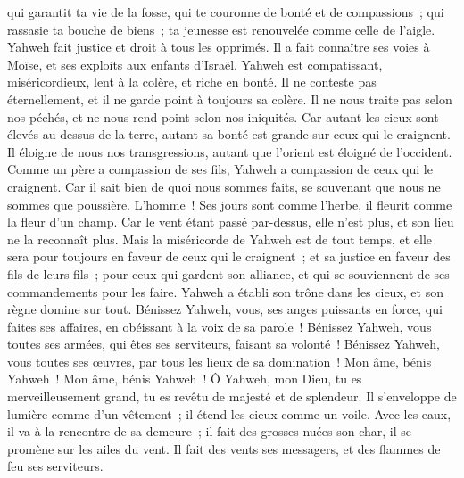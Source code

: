 \begin{multicols}{2}
qui garantit ta vie de la fosse, qui te couronne de bonté et de compassions~;
qui rassasie ta bouche de biens~; ta jeunesse est renouvelée comme celle de l'aigle.
Yahweh fait justice et droit à tous les opprimés.
Il a fait connaître ses voies à Moïse, et ses exploits aux enfants d'Israël.
Yahweh est compatissant, miséricordieux, lent à la colère, et riche en bonté.
Il ne conteste pas éternellement, et il ne garde point à toujours sa colère.
Il ne nous traite pas selon nos péchés, et ne nous rend point selon nos iniquités.
Car autant les cieux sont élevés au-dessus de la terre, autant sa bonté est grande sur ceux qui le craignent.
Il éloigne de nous nos transgressions, autant que l'orient est éloigné de l'occident.
Comme un père a compassion de ses fils, Yahweh a compassion de ceux qui le craignent.
Car il sait bien de quoi nous sommes faits, se souvenant que nous ne sommes que poussière.
L'homme~! Ses jours sont comme l'herbe, il fleurit comme la fleur d'un champ.
Car le vent étant passé par-dessus, elle n'est plus, et son lieu ne la reconnaît plus.
Mais la miséricorde de Yahweh est de tout temps, et elle sera pour toujours en faveur de ceux qui le craignent~; et sa justice en faveur des fils de leurs fils~;
pour ceux qui gardent son alliance, et qui se souviennent de ses commandements pour les faire.
Yahweh a établi son trône dans les cieux, et son règne domine sur tout.
Bénissez Yahweh, vous, ses anges puissants en force, qui faites ses affaires, en obéissant à la voix de sa parole~!
Bénissez Yahweh, vous toutes ses armées, qui êtes ses serviteurs, faisant sa volonté~!
Bénissez Yahweh, vous toutes ses œuvres, par tous les lieux de sa domination~! Mon âme, bénis Yahweh~!
\VerseOne{}Mon âme, bénis Yahweh~! Ô Yahweh, mon Dieu, tu es merveilleusement grand, tu es revêtu de majesté et de splendeur.
Il s'enveloppe de lumière comme d'un vêtement~; il étend les cieux comme un voile.
Avec les eaux, il va à la rencontre de sa demeure~; il fait des grosses nuées son char, il se promène sur les ailes du vent.
Il fait des vents ses messagers, et des flammes de feu ses serviteurs.

\end{multicols}
